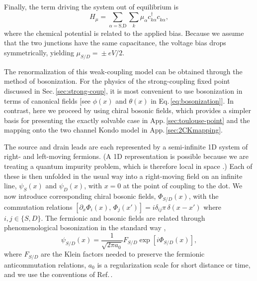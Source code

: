 \documentclass[aps,prb,reprint,floatfix,superscriptaddress,amssymb,amsmath]{revtex4-2}
\newcommand{\phdag}{{\phantom{\dagger}}}
\begin{document}
Finally, the term driving the system out of equilibrium is  
\begin{equation}
H_\mu= \sum_{\alpha=\text{S,D}} \sum_k \mu_\alpha^\phdag c_{k\alpha}^{\dagger}c_{k\alpha}^\phdag, 
\label{eq:Hmu}
\end{equation}
where the chemical potential is related to the applied bias. Because we assume that the two junctions have the same capacitance, the voltage bias drops symmetrically, yielding $\mu_{S/D}^\phdag \!=\!\pm eV/2$. 

The renormalization of this weak-coupling model can be obtained through the method of bosonization. For the physics of the  strong-coupling fixed point discussed in Sec.\,\ref{sec:strong-coup}, it is most convenient to use bosonization in terms of canonical fields [see $\phi(x)$ and $\theta(x)$ in Eq.\,\eqref{eq:bosonization}]. In contrast, here we proceed by using chiral bosonic fields, which provides a simpler basis for presenting the exactly solvable case in App.\,\ref{sec:toulouse-point} and the mapping onto the two channel Kondo model in App.\,\ref{sec:2CKmapping}.

The source and drain leads are each represented by a semi-infinite 1D system of right- and left-moving fermions.  
(A 1D representation is possible because we are treating a quantum impurity problem, which is therefore local in space \cite{HewsonBook,GogolinBook}.) 
Each of these is then unfolded in the usual way into a right-moving field on an infinite line, 
$\psi_S (x)$ and $\psi_D (x)$, with $x\!=\!0$ at the point of coupling to the dot. We now introduce corresponding chiral bosonic fields, $\Phi_{S/D}(x)$, with the commutation relations 
 $[\partial_x \Phi_{i}(x),\,\Phi_{j}(x')] = i\delta_{ij}\pi\, \delta (x-x')$ where $i,j \in \{S,D\}$.
The fermionic and bosonic fields are related through phenomenological bosonization in the standard way \cite{GiamarchiBook,GogolinBook}, 
\begin{equation}
 \psi_{S/D}^\phdag (x) =\frac{1}{\sqrt{2\pi a_0}}F_{S/D}\exp[i\Phi_{S/D}(x)] ,
\end{equation}
where $F_{S/D}$ are the Klein factors needed to preserve the fermionic anticommutation relations, $a_0$ is a regularization scale for short distance or time, and we use the conventions of Ref.\,\cite{GiamarchiBook}. 
\end{document}
